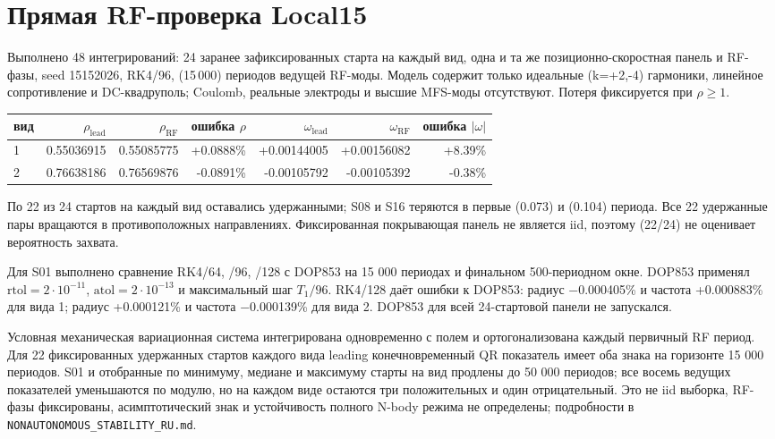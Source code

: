 \documentclass[11pt,a4paper]{article}
\begin{document}
\section{Прямая RF-проверка Local15}
Выполнено 48 интегрирований: 24 заранее зафиксированных старта на каждый вид, одна и та же позиционно-скоростная панель и RF-фазы, seed 15152026, RK4/96, (15\,000) периодов ведущей RF-моды. Модель содержит только идеальные (k=+2,-4) гармоники, линейное сопротивление и DC-квадруполь; Coulomb, реальные электроды и высшие MFS-моды отсутствуют. Потеря фиксируется при \(\rho\ge1\).

\begin{center}
\begin{tabular}{lrrrrrr}
\toprule
вид & \(\rho_\mathrm{lead}\) & \(\rho_\mathrm{RF}\) & ошибка \(\rho\) & \(\omega_\mathrm{lead}\) & \(\omega_\mathrm{RF}\) & ошибка \(|\omega|\)\\
\midrule
1 & 0.55036915 & 0.55085775 & +0.0888\% & +0.00144005 & +0.00156082 & +8.39\%\\
2 & 0.76638186 & 0.76569876 & -0.0891\% & -0.00105792 & -0.00105392 & -0.38\%\\
\bottomrule
\end{tabular}
\end{center}

По 22 из 24 стартов на каждый вид оставались удержанными; S08 и S16 теряются в первые (0.073) и (0.104) периода. Все 22 удержанные пары вращаются в противоположных направлениях. Фиксированная покрывающая панель не является iid, поэтому (22/24) не оценивает вероятность захвата.

Для S01 выполнено сравнение RK4/64, /96, /128 с DOP853 на 15 000 периодах и финальном 500-периодном окне. DOP853 применял \(\mathrm{rtol}=2\cdot10^{-11}\), \(\mathrm{atol}=2\cdot10^{-13}\) и максимальный шаг \(T_1/96\). RK4/128 даёт ошибки к DOP853: радиус −0.000405\% и частота +0.000883\% для вида 1; радиус +0.000121\% и частота −0.000139\% для вида 2. DOP853 для всей 24-стартовой панели не запускался.

Условная механическая вариационная система интегрирована одновременно с полем и ортогонализована каждый первичный RF период. Для 22 фиксированных удержанных стартов каждого вида leading конечновременный QR показатель имеет оба знака на горизонте 15 000 периодов. S01 и отобранные по минимуму, медиане и максимуму старты на вид продлены до 50 000 периодов; все восемь ведущих показателей уменьшаются по модулю, но на каждом виде остаются три положительных и один отрицательный. Это не iid выборка, RF-фазы фиксированы, асимптотический знак и устойчивость полного N-body режима не определены; подробности в \texttt{NONAUTONOMOUS\_STABILITY\_RU.md}.
\end{document}
